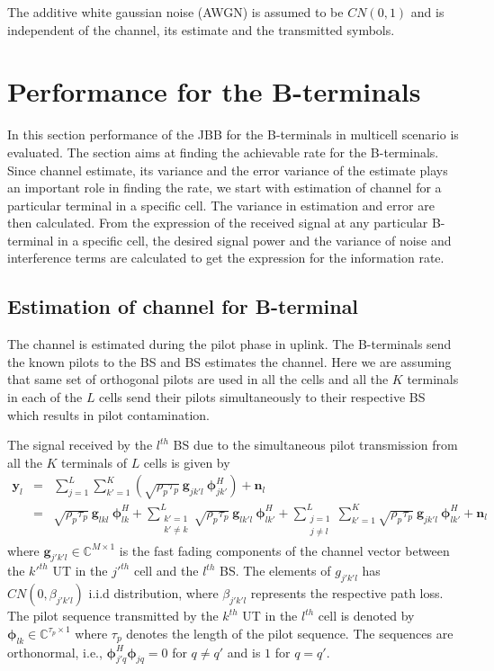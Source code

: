 \documentclass[10pt, a4paper, twoside,fleqn]{article}
\begin{document}
The additive white gaussian noise (AWGN) is assumed to be $CN(0,1)$ and is independent of the channel, its estimate and the transmitted symbols.

\section{Performance for the B-terminals}
	In this section performance of the JBB for the B-terminals in multicell scenario is evaluated. The section aims at finding the achievable rate for the B-terminals. Since channel estimate, its variance and the error variance of the estimate plays an important role in finding the rate, we start with estimation of channel for a particular terminal in a specific cell. The variance in estimation and error are then calculated. From the expression of the received signal at any particular B-terminal in a specific cell, the desired signal power and the variance of noise and interference terms are calculated to get the expression for the information rate.

\subsection{Estimation of channel for B-terminal} \label{sec:btchesti}
	The channel is estimated during the pilot phase in uplink. The B-terminals send the known pilots to the BS and BS estimates the channel. Here we are assuming that same set of orthogonal pilots are used in all the cells and all the $K$ terminals in each of the $L$ cells send their pilots simultaneously to their respective BS which results in pilot contamination.

The signal received by the $l^{th}$ BS due to the simultaneous pilot transmission from  all the $K$ terminals of $L$ cells is given by
\begin{eqnarray}\label{eq:rcvy}
	\pmb{y}_{l} &=& \sum_{j=1}^{L} \sum_{k'=1}^{K} \left(\sqrt{\rho_p \tau_p} \ \pmb{g}_{jk'l} \ \pmb{\phi}^H_{jk'}\right)
        		    +  \pmb{n}_{l} \nonumber \\                    
    			   &=& \sqrt{\rho_p \tau_p} \ \pmb{g}_{lkl} \ \pmb{\phi}^H_{lk}
        			+  \sum_{\substack{k'=1 \\ k' \neq k}}^{L} \sqrt{\rho_p \tau_p} \ \pmb{g}_{lk'l} \ \pmb{\phi}^H_{lk'}
        		    +  \sum_{\substack{j=1 \\ j \neq l}}^{L} \sum_{k'=1}^{K} \sqrt{\rho_p \tau_p} \
                       \pmb{g}_{jk'l} \ \pmb{\phi}^H_{lk'}
    			    +  \pmb{n}_{l}
\end{eqnarray}
where $\pmb{g}_{j'k'l} \in {\mathbb C}^{M \times 1}$ is the fast fading components of the channel vector between the $k'^{th}$ UT in the $j'^{th}$ cell and the $l^{th}$ BS. The elements of $g_{j'k'l}$ has $CN(0,\beta_{j'k'l})$ i.i.d distribution, where $\beta_{j'k'l}$ represents the respective path loss. The pilot sequence transmitted by the $k^{th}$ UT in the $l^{th}$ cell is denoted by $\pmb{\phi}_{lk} \in {\mathbb C}^{\tau_p \times 1}$ where $\tau_p$ denotes the length of the pilot sequence. The sequences are orthonormal, i.e., $\pmb{\phi}_{j'q}^H \pmb{\phi}_{jq} = 0$ for  $q \ne q'$ and is $1$ for $q=q'$.
\end{document}
